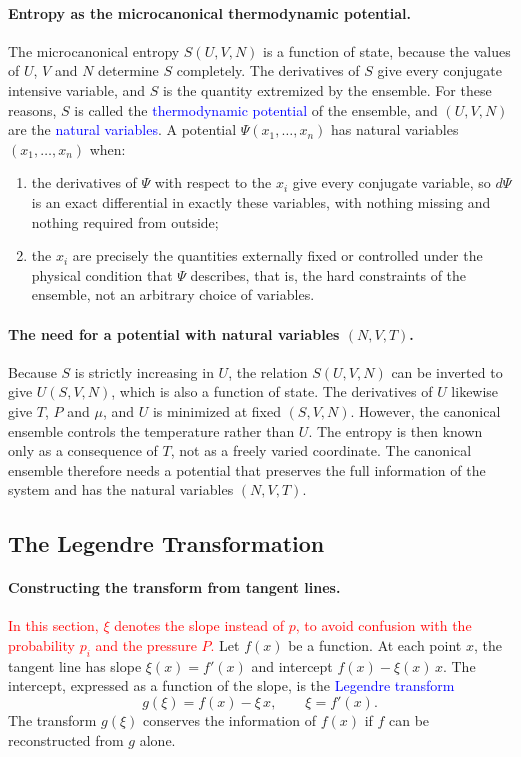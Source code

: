 \paragraph{Entropy as the microcanonical thermodynamic potential.}
The microcanonical entropy $S(U,V,N)$ is a function of state, because the
values of $U$, $V$ and $N$ determine $S$ completely. The derivatives of $S$
give every conjugate intensive variable, and $S$ is the quantity extremized
by the ensemble. For these reasons, $S$ is called the
\textcolor{blue}{thermodynamic potential} of the ensemble, and $(U,V,N)$ are
the \textcolor{blue}{natural variables}. A potential $\Psi(x_1,\ldots,x_n)$
has natural variables $(x_1,\ldots,x_n)$ when:
\begin{enumerate}
    \item[(i)] the derivatives of $\Psi$ with respect to the $x_i$ give every
    conjugate variable, so $d\Psi$ is an exact differential in exactly
    these variables, with nothing missing and nothing required from outside;
    \item[(ii)] the $x_i$ are precisely the quantities externally fixed or
    controlled under the physical condition that $\Psi$ describes, that is,
    the hard constraints of the ensemble, not an arbitrary choice of
    variables.
\end{enumerate}

\paragraph{The need for a potential with natural variables $(N,V,T)$.}
Because $S$ is strictly increasing in $U$, the relation $S(U,V,N)$ can be
inverted to give $U(S,V,N)$, which is also a function of state. The
derivatives of $U$ likewise give $T$, $P$ and $\mu$, and $U$ is minimized at
fixed $(S,V,N)$. However, the canonical ensemble controls the temperature
rather than $U$. The entropy is then known only as a consequence of $T$, not
as a freely varied coordinate. The canonical ensemble therefore needs a
potential that preserves the full information of the system and has the
natural variables $(N,V,T)$.

\subsection{The Legendre Transformation}

\paragraph{Constructing the transform from tangent lines.}
\textcolor{red}{In this section, $\xi$ denotes the slope instead of $p$, to
avoid confusion with the probability $p_i$ and the pressure $P$.}
Let $f(x)$ be a function. At each point $x$, the tangent line has slope
$\xi(x)=f'(x)$ and intercept $f(x)-\xi(x)\,x$. The intercept, expressed as a
function of the slope, is the \textcolor{blue}{Legendre transform}
\begin{equation}
    \boxed{g(\xi)=f(x)-\xi\,x,\qquad \xi=f'(x).}
\end{equation}
The transform $g(\xi)$ conserves the information of $f(x)$ if $f$ can be
reconstructed from $g$ alone.

